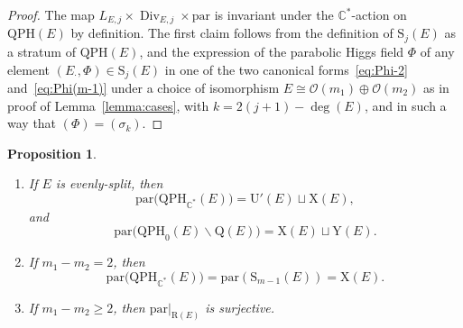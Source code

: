 \documentclass[pdftex]{sigma}
\newcommand{\field}[1]{\ensuremath{\mathbb{#1}}}
\newcommand{\CC}{\field{C}}
\newcommand{\calO}{\mathcal{O}}
\newcommand{\qp}{\boldsymbol{\cdot}}
\DeclareMathOperator{\Div}{Div}
\numberwithin{equation}{section}
\newtheorem{Proposition}[Theorem]{Proposition}
 { \theoremstyle{definition}
\newtheorem{Definition}[Theorem]{Definition}
\newtheorem{Note}[Theorem]{Note}
\newtheorem{Example}[Theorem]{Example}
\newtheorem{Remark}[Theorem]{Remark} }
\begin{document}
\begin{proof}
The map $L_{E,j}\times\Div_{E,j}\times\mathrm{par}$ is invariant under the $\CC^{*}$-action on $\mathrm{QPH}(E)$ by definition. The first claim follows from the definition of $\mathrm{S}_{j}(E)$ as a stratum of $\mathrm{QPH}(E)$, and the expression of the parabolic Higgs field $\Phi$ of any element $(E_{\qp},\Phi)\in\mathrm{S}_{j}(E)$ in one of the two canonical forms~\eqref{eq:Phi-2} and~\eqref{eq:Phi(m-1)} under a choice of isomorphism $E\cong \calO(m_{1})\oplus\calO(m_{2})$ as in proof of Lemma~\ref{lemma:cases}, with $k=2(j+1) -\deg(E)$, and in such a way that $(\Phi) = (\sigma_{k})$.
\end{proof}


\begin{Proposition}\label{prop:QPH-par}\quad
\begin{enumerate}\itemsep=0pt
\item[$(i)$] If $E$ is evenly-split, then
\[
\mathrm{par}\bigl(\mathrm{QPH}_{\CC^{*}}(E)\bigr) = \mathrm{U}'(E)\sqcup \mathrm{X}(E),
\]
and
\[
\mathrm{par}\bigl(\mathrm{QPH}_{0}(E)\backslash\mathrm{Q}(E)\bigr) = \mathrm{X}(E)\sqcup\mathrm{Y}(E).
\]
\item[$(ii)$] If $m_{1}-m_{2}=2$, then
\[
\mathrm{par}\bigl(\mathrm{QPH}_{\CC^{*}}(E)\bigr) = \mathrm{par}(\mathrm{S}_{m-1}(E)) = \mathrm{X}(E).
\]
\item[$(iii)$] If $m_{1}-m_{2}\geq 2$, then $\mathrm{par}\vert_{\mathrm{R}(E)}$ is surjective.
\end{enumerate}
\end{Proposition}
\end{document}
